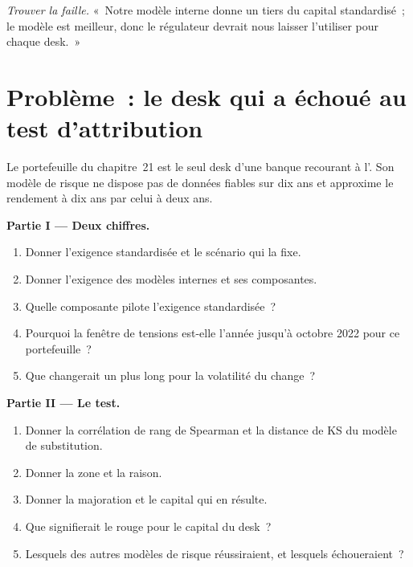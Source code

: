 \begin{exercise}[$\star\star\star$]\label{exo:rc:regulatory-capital-for-trading-books:8}
\emph{Trouver la faille.} «~Notre modèle interne donne un tiers du capital standardisé~; le modèle est
meilleur, donc le régulateur devrait nous laisser l'utiliser pour chaque desk.~»
\end{exercise}

\section{Problème~: le desk qui a échoué au test d'attribution}

\begin{problem}\label{pb:rc:regulatory-capital-for-trading-books:1}
Le portefeuille du chapitre~21 est le seul desk d'une banque recourant à l'. Son modèle de risque
ne dispose pas de données fiables sur dix ans et approxime le rendement à dix ans par celui à deux ans.

\medskip\noindent\textbf{Partie I --- Deux chiffres.}
\begin{enumerate}
\item Donner l'exigence standardisée et le scénario qui la fixe.
\item Donner l'exigence des modèles internes et ses composantes.
\item Quelle composante pilote l'exigence standardisée~?
\item Pourquoi la fenêtre de tensions est-elle l'année jusqu'à octobre 2022 pour ce portefeuille~?
\item Que changerait un  plus long pour la volatilité du change~?
\end{enumerate}

\medskip\noindent\textbf{Partie II --- Le test.}
\begin{enumerate}[resume]
\item Donner la corrélation de rang de Spearman et la distance de KS du modèle de substitution.
\item Donner la zone et la raison.
\item Donner la majoration et le capital qui en résulte.
\item Que signifierait le rouge pour le capital du desk~?
\item Lesquels des autres modèles de risque réussiraient, et lesquels échoueraient~?
\end{enumerate}


\end{problem}
